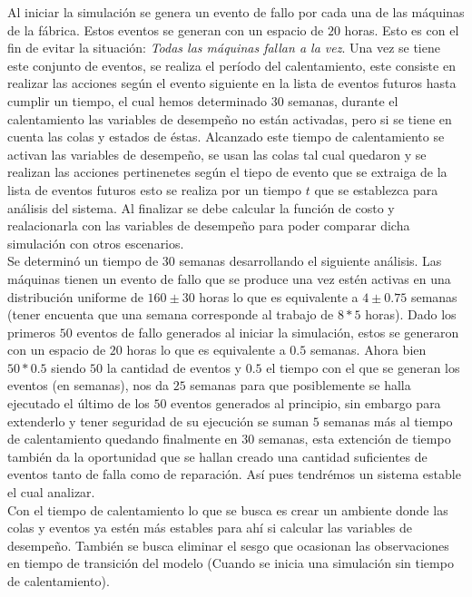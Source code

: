 \documentclass[12pt]{article}
\begin{document}
Al iniciar la simulación se genera un evento de fallo por cada una de las máquinas de la fábrica. Estos eventos se generan con un  espacio de $20$ horas. Esto es con el fin de evitar la situación: \emph{Todas las máquinas fallan a la vez}. Una vez se tiene este conjunto de eventos, se realiza el período del calentamiento, este consiste en realizar las acciones seg\'un el evento siguiente en la lista de eventos futuros hasta cumplir un tiempo, el cual hemos determinado 30 semanas, durante el calentamiento las variables de desempeño no están activadas, pero si se tiene en cuenta las colas y estados de éstas. Alcanzado este tiempo de calentamiento se activan las variables de desempeño, se usan las colas tal cual quedaron y se realizan las acciones pertinenetes seg\'un el tiepo de evento que se extraiga de la lista de eventos futuros esto se realiza por un tiempo $t$ que se establezca para análisis del sistema. Al finalizar se debe calcular la función de costo y realacionarla con las variables de desempeño para poder comparar dicha simulación con otros escenarios.\\

Se determinó un tiempo de 30 semanas desarrollando el siguiente análisis. Las máquinas tienen un evento de fallo que se produce una vez estén activas en una distribución uniforme de $160\pm30$ horas lo que es equivalente a $4\pm0.75$ semanas (tener encuenta que una semana corresponde al trabajo de $8*5$  horas). Dado los primeros $50$ eventos de fallo generados al iniciar la simulación, estos se generaron con un espacio de $20$ horas lo que es equivalente a $0.5$ semanas. Ahora bien $50*0.5$ siendo $50$ la cantidad de eventos y $0.5$ el tiempo con el que se generan los eventos (en semanas), nos da $25$ semanas para que posiblemente se halla ejecutado el último de los $50$ eventos generados al principio, sin embargo para extenderlo y tener seguridad de su ejecución se suman $5$ semanas más al tiempo de calentamiento quedando finalmente en $30$ semanas, esta extención de tiempo también da la oportunidad que se hallan creado una cantidad suficientes de eventos tanto de falla como de reparación. Así pues tendrémos un sistema estable el cual analizar.\\



Con el tiempo de calentamiento lo que se busca es crear un ambiente donde las colas y eventos ya estén más estables para ahí si calcular las variables de desempeño. También se busca eliminar el sesgo que ocasionan las observaciones en tiempo de transición del modelo (Cuando se inicia una simulación sin tiempo de calentamiento). \\
\end{document}
